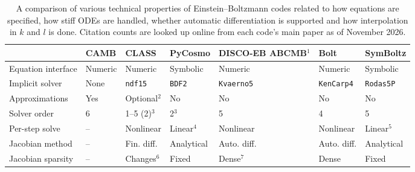 \documentclass[USenglish, thumbmarks]{uiophdthesis} %
\newcommand\EB{Einstein--Boltzmann}
\begin{document}
\begin{table}[tb]
\caption[Comparison of technical properties of \EB{} codes]{%
A comparison of various technical properties of \EB{} codes
related to how equations are specified,
how stiff ODEs are handled,
whether automatic differentiation is supported
and how interpolation in $k$ and $l$ is done.
Citation counts are looked up online from each code's main paper as of November 2026.
}
\label{tab:comparison}
\small
\setlength{\tabcolsep}{1.5pt}
\def\arraystretch{1.5}
{\centering %
\begin{tabular}{lllllll}
\toprule
& \textbf{CAMB} & \textbf{CLASS} & \textbf{PyCosmo} & \makecell[l]{\textbf{DISCO-EB}\\\textbf{ABCMB}${}^1$} & \textbf{Bolt} & \textbf{SymBoltz} \\
\midrule
Equation interface     & Numeric                       & Numeric                            & Symbolic                        & Numeric                            & Numeric                            & Symbolic                  \\
\midrule
Implicit solver        & None                          & \texttt{ndf15}                     & \texttt{BDF2}                   & \texttt{Kvaerno5}                  & \texttt{KenCarp4}                  & \texttt{Rodas5P}                  \\
Approximations         & Yes                           & Optional${}^2$                     & No                              & No                                 & No                                 & No                  \\
Solver order           & 6                             & 1--5 (2)${}^3$                     & 2${}^3$                         & 5                                  & 4                                  & 5                     \\
Per-step solve         & --                            & Nonlinear                          & Linear${}^4$                    & Nonlinear                          & Nonlinear                          & Linear${}^5$                  \\
Jacobian method        & --                            & Fin. diff.                         & Analytical                      & Auto. diff.                        & Auto. diff.                        & Analytical                  \\
Jacobian sparsity      & --                            & Changes${}^6$                      & Fixed                           & Dense${}^7$                        & Dense                              & Fixed                  \\

\end{tabular}}
\end{table}
\end{document}
